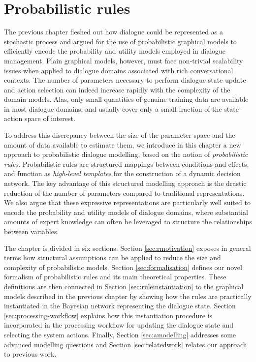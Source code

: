 \chapter{Probabilistic rules}
\label{chap:rules}

The previous chapter fleshed out how dialogue could be represented as a stochastic process and argued for the use of probabilistic graphical models to efficiently encode the probability and utility models employed in dialogue management. Plain graphical models, however, must face non-trivial scalability issues when applied to dialogue domains associated with rich conversational contexts. The number of parameters necessary to perform dialogue state update and action selection can indeed increase rapidly with the complexity of the domain models. Alas, only small quantities of genuine training data are available in most dialogue domains, and usually cover only a small fraction of the state--action space of interest. 

To address this discrepancy between the size of the parameter space and the amount of data available to estimate them, we introduce in this chapter a new approach to probabilistic dialogue modelling, based on the notion of \textit{probabilistic rules}.  Probabilistic rules are structured mappings between conditions and effects, and function as \textit{high-level templates} for the construction of a dynamic decision network.  The key advantage of this structured modelling approach is the drastic reduction of the number of parameters compared to traditional representations.  We also argue that these expressive representations are particularly well suited to encode the probability and utility models of dialogue domains, where substantial amounts of expert knowledge can often be leveraged to structure the relationships between variables. 

The chapter is divided in six sections. Section \ref{sec:rmotivation} exposes in general terms how structural assumptions can be applied to reduce the size and complexity of probabilistic models.  Section \ref{sec:formalisation} defines our novel formalism of probabilistic rules and its main theoretical properties.  These definitions are then connected in Section \ref{sec:ruleinstantiation} to the graphical models described in the previous chapter by showing how the rules are practically instantiated in the Bayesian network representing the dialogue state. Section \ref{sec:processing-workflow} explains how this instantiation procedure is incorporated in the processing workflow for updating the dialogue state and selecting the system actions. Finally, Section \ref{sec:amodelling} addresses some advanced modelling questions and Section \ref{sec:relatedwork} relates our approach to previous work.


